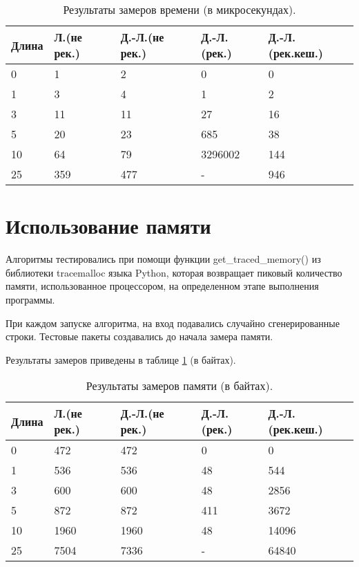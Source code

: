 \begin{table}[h]
	\begin{center}
			\captionsetup{justification=raggedright,singlelinecheck=off}
			\caption{\label{tab:time}Результаты замеров времени (в микросекундах).}
			\begin{tabular}{|l|l|l|l|l|}
				
				\hline
				Длина&Л.(не рек.)&Д.-Л.(не рек.)&Д.-Л.(рек.)&Д.-Л.(рек.кеш.)\\
				\hline
				0 & 1 & 2 & 0 & 0 \\
				\hline
				1 & 3 & 4 & 1 & 2 \\
				\hline
				3 & 11 & 11 & 27 & 16 \\
				\hline
				5 & 20 & 23 & 685 & 38 \\
				\hline
				10 & 64 & 79 & 3296002 & 144 \\
				\hline
				25 & 359 & 477 & - & 946 \\
				\hline
			\end{tabular}
	\end{center}
\end{table}

 
\section{Использование памяти}

Алгоритмы тестировались при помощи функции get\_traced\_memory() из библиотеки tracemalloc языка Python, которая возвращает пиковый количество памяти, использованное процессором, на определенном этапе выполнения программы.

При каждом запуске алгоритма, на вход подавались случайно сгенерированные строки. Тестовые пакеты создавались до начала замера памяти.

Результаты замеров приведены в таблице \ref{tab:time} (в байтах).

\begin{table}[h]
	\begin{center}
		\captionsetup{justification=raggedright,singlelinecheck=off}
		\caption{\label{tab:memory}Результаты замеров памяти (в байтах).}
		
		\begin{tabular}{|l|l|l|l|l|}
			
			\hline
			Длина&Л.(не рек.)&Д.-Л.(не рек.)&Д.-Л.(рек.)&Д.-Л.(рек.кеш.)\\
			\hline
			0 & 472 & 472 & 0 & 0 \\
			\hline
			1 & 536 & 536 & 48 & 544 \\
			\hline
			3 & 600 & 600 & 48 & 2856 \\
			\hline
			5 & 872 & 872 & 411 & 3672 \\
			\hline
			10 & 1960 & 1960 & 48 & 14096 \\
			\hline
			25 & 7504 & 7336 & - & 64840 \\
			\hline
		\end{tabular}
	\end{center}
\end{table}

